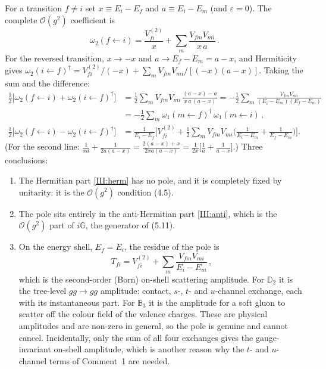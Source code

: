 For a transition $f\neq i$ set $x\equiv E_i-E_f$ and $a\equiv E_i-E_m$ (and $\varepsilon=0$). The complete $\mathcal O(g^2)$ coefficient is
\[
\omega_2(f\!\leftarrow\! i)=\frac{V^{(2)}_{fi}}{x}+\sum_m\frac{V_{fm}V_{mi}}{x\,a}\,.
\]
For the reversed transition, $x\to-x$ and $a\to E_f-E_m=a-x$, and Hermiticity gives $\omega_2(i\!\leftarrow\! f)^\dagger=V^{(2)}_{fi}/(-x)+\sum_mV_{fm}V_{mi}/[(-x)(a-x)]$. Taking the sum and the difference:
\begin{align}
\tfrac12\big[\omega_2(f\!\leftarrow\! i)+\omega_2(i\!\leftarrow\! f)^\dagger\big]
&=\tfrac12\sum_mV_{fm}V_{mi}\,\frac{(a-x)-a}{x\,a\,(a-x)}=-\frac12\sum_m\frac{V_{fm}V_{mi}}{(E_i-E_m)(E_f-E_m)}\nonumber\\
&=-\frac12\sum_m\omega_1(m\!\leftarrow\! f)^\dagger\,\omega_1(m\!\leftarrow\! i)\,,
\label{III:herm}\\
\tfrac12\big[\omega_2(f\!\leftarrow\! i)-\omega_2(i\!\leftarrow\! f)^\dagger\big]
&=\frac{1}{E_i-E_f}\Big[V^{(2)}_{fi}+\tfrac12\sum_mV_{fm}V_{mi}\Big(\frac{1}{E_i-E_m}+\frac{1}{E_f-E_m}\Big)\Big].
\label{III:anti}
\end{align}
(For the second line: $\frac{1}{xa}+\frac{1}{2a(a-x)}=\frac{2(a-x)+x}{2xa(a-x)}=\frac{1}{2x}\big[\frac1a+\frac{1}{a-x}\big]$.) Three conclusions:
\begin{enumerate}[leftmargin=20pt,itemsep=2pt]
\item The Hermitian part \eqref{III:herm} has no pole, and it is completely fixed by unitarity: it is the $\mathcal O(g^2)$ condition (4.5).
\item The pole sits entirely in the anti-Hermitian part \eqref{III:anti}, which is the $\mathcal O(g^2)$ part of $i\mathbb G$, the generator of (5.11).
\item On the energy shell, $E_f=E_i$, the residue of the pole is
\begin{equation}
T_{fi}=V^{(2)}_{fi}+\sum_m\frac{V_{fm}V_{mi}}{E_i-E_m}\,,
\label{III:T}
\end{equation}
which is the second-order (Born) on-shell scattering amplitude. For $\mathbb D_2$ it is the tree-level $gg\to gg$ amplitude: contact, $s$-, $t$- and $u$-channel exchange, each with its instantaneous part. For $\mathbb B_3$ it is the amplitude for a soft gluon to scatter off the colour field of the valence charges. These are physical amplitudes and are non-zero in general, so the pole is genuine and cannot cancel. Incidentally, only the sum of all four exchanges gives the gauge-invariant on-shell amplitude, which is another reason why the $t$- and $u$-channel terms of Comment~1 are needed.
\end{enumerate}

